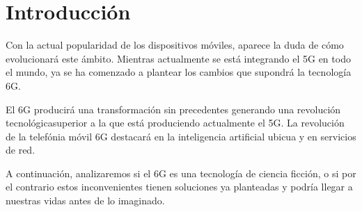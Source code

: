\section{Introducción}
\label{sec:introduccion}

Con la actual popularidad de los dispositivos móviles, aparece la duda de cómo evolucionará este ámbito. Mientras actualmente se está integrando el 5G en todo el mundo, ya se ha comenzado a plantear los cambios que supondrá la tecnología 6G.

El 6G producirá una transformación sin precedentes generando una revolución tecnológicasuperior a la que está produciendo actualmente el 5G. La revolución de la telefónia móvil 6G destacará en la inteligencia artificial ubicua y en servicios de red.                  

A continuación, analizaremos si el 6G es una tecnología de ciencia ficción, o si por el contrario estos inconvenientes tienen soluciones ya planteadas y podría llegar a nuestras vidas antes de lo imaginado.

